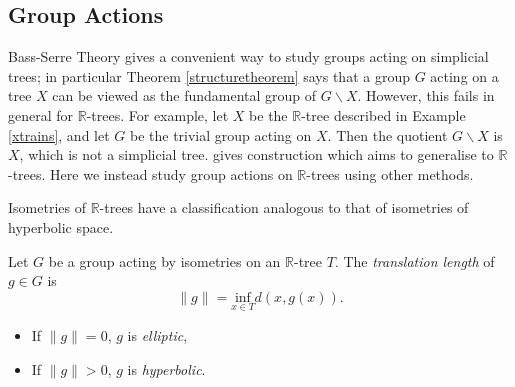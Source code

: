 \subsection{Group Actions}
Bass-Serre Theory gives a convenient way to study groups acting on simplicial trees; in particular Theorem \ref{structuretheorem} says that a group $G$ acting on a tree $X$ can be viewed as the fundamental group of $G\backslash X$. However, this fails in general for $\mathbb{R}$-trees. For example, let $X$ be the $\mathbb{R}$-tree described in Example \ref{xtrains}, and let $G$ be the trivial group acting on $X$. Then the quotient $G\backslash X$ is $X$, which is not a simplicial tree. \cite{Levit_rtrees} gives construction which aims to generalise to $\mathbb{R}$-trees. Here we instead study group actions on $\mathbb{R}$-trees using other methods.

Isometries of $\mathbb{R}$-trees have a classification analogous to that of isometries of hyperbolic space. 
\begin{definition}
    Let $G$ be a group acting by isometries on an $\mathbb{R}$-tree $T$. The \emph{translation length} of $g\in G$ is \[\lVert g\rVert=\underset{x\in T}{\text{inf}}d(x,g(x)).\]
    \begin{itemize}
        \item If $\lVert g\rVert=0$, $g$ is \emph{elliptic},
        \item If $\lVert g\rVert>0$, $g$ is \emph{hyperbolic}.
    \end{itemize}
\end{definition}

